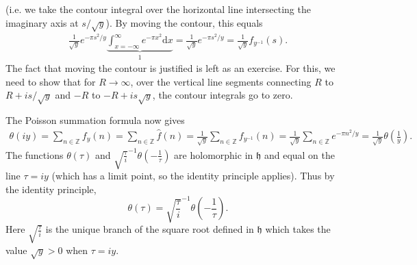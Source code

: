 \documentclass{article}
\theoremstyle{definition}
\begin{document}
(i.e. we take the contour integral over the horizontal line intersecting the imaginary axis at $s/\sqrt{y}$). By moving the contour, this equals 
\begin{align*}
    \frac{1}{\sqrt{y}} e^{-\pi s^2/y}\underbrace{\int_{x=-\infty}^{\infty} e^{-\pi x^2}\mathrm{d}x}_{1} = \frac{1}{\sqrt{y}}e^{-\pi s^2/y} = \frac{1}{\sqrt{y}}f_{y^{-1}}(s).
\end{align*}
The fact that moving the contour is justified is left as an exercise. For this, we need to show that for $R \to \infty$, over the vertical line segments connecting $R$ to $R + is/\sqrt{y}$ and $-R$ to $-R+is \sqrt{y}$, the contour integrals go to zero.
\vspace{1mm}
 
The Poisson summation formula now gives 
\begin{align*}
    \theta(iy) = \sum_{ n \in \mathbb{Z}}^{} f_y(n) = \sum_{n \in \mathbb{Z}}^{} \hat{f}(n) = \frac{1}{\sqrt{y}}\sum_{n \in \mathbb{Z}}^{} f_{y^{-1}}(n) = \frac{1}{\sqrt{y}}\sum_{ n \in \mathbb{Z}}^{} e^{- \pi n^2/y} = \frac{1}{\sqrt{y}}\theta\left(\frac{1}{y}\right).
\end{align*}
The functions $\theta(\tau)$ and $\sqrt{\frac{\tau}{i}}^{-1} \theta \left(-\frac{1}{\tau}\right)$ are holomorphic in $\mathfrak{h}$ and equal on the line $\tau = iy$ (which has a limit point, so the identity principle applies). Thus by the identity principle, $$\theta(\tau) = \sqrt{\frac{\tau}{i}}^{-1} \theta \left(-\frac{1}{\tau}\right).$$
Here $\sqrt{\frac{\tau}{i}}$ is the unique branch of the square root defined in $\mathfrak{h}$ which takes the value $\sqrt{y}>0$ when $\tau = iy$.
\end{document}
